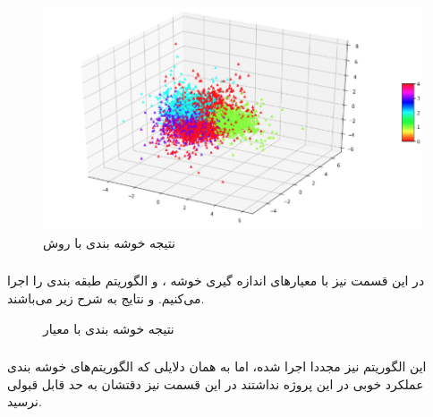 \begin{figure}[h!]
    \centering
    \includegraphics[width=0.65\linewidth]{images/kmeans2.png}
    \caption{نتیجه خوشه بندی با روش }
    \label{fig:kmeans2}
\end{figure}

\subsubsection{}
در این قسمت نیز با معیارهای اندازه گیری خوشه ،  و  الگوریتم طبقه بندی  را اجرا می‌کنیم. و نتایج به شرح زیر می‌باشند.

\begin{figure}[h]
    \centering
    \caption{نتیجه خوشه بندی با معیار }
    \label{fig:ward2}
\end{figure}

\subsubsection{}
این الگوریتم نیز مجددا اجرا شده، اما به همان دلایلی که الگوریتم‌های خوشه بندی عملکرد خوبی در این پروژه نداشتند در این قسمت نیز دقتشان به حد قابل قبولی نرسید.

